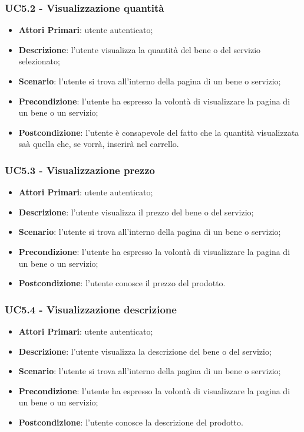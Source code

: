  \subsubsection{UC5.2 - Visualizzazione quantità}
\begin{itemize}
	\item \textbf{Attori Primari}: utente autenticato;
	\item \textbf{Descrizione}: l'utente visualizza la quantità del bene o del servizio selezionato;
	\item \textbf{Scenario}: l'utente si trova all'interno della pagina di un bene o servizio;
	\item \textbf{Precondizione}: l'utente ha espresso la volontà di visualizzare la pagina di un bene o un servizio;
	\item \textbf{Postcondizione}: l'utente è consapevole del fatto che la quantità visualizzata saà quella che, se vorrà, inserirà nel carrello.
\end{itemize}
 \subsubsection{UC5.3 - Visualizzazione prezzo}
\begin{itemize}
	\item \textbf{Attori Primari}: utente autenticato;
	\item \textbf{Descrizione}: l'utente visualizza il prezzo del bene o del servizio;
	\item \textbf{Scenario}: l'utente si trova all'interno della pagina di un bene o servizio;
	\item \textbf{Precondizione}: l'utente ha espresso la volontà di visualizzare la pagina di un bene o un servizio;
	\item \textbf{Postcondizione}: l'utente conosce il prezzo del prodotto.
\end{itemize}
 \subsubsection{UC5.4 - Visualizzazione descrizione}
\begin{itemize}
	\item \textbf{Attori Primari}: utente autenticato;
	\item \textbf{Descrizione}: l'utente visualizza la descrizione del bene o del servizio;
	\item \textbf{Scenario}: l'utente si trova all'interno della pagina di un bene o servizio;
	\item \textbf{Precondizione}: l'utente ha espresso la volontà di visualizzare la pagina di un bene o un servizio;
	\item \textbf{Postcondizione}: l'utente conosce la descrizione del prodotto.
\end{itemize}